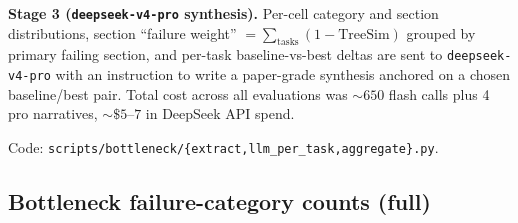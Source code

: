 \documentclass{article}
\begin{document}
\textbf{Stage 3 (\texttt{deepseek-v4-pro} synthesis).} Per-cell category and section distributions, section ``failure weight'' $= \sum_{\mathrm{tasks}}(1 - \mathrm{TreeSim})$ grouped by primary failing section, and per-task baseline-vs-best deltas are sent to \texttt{deepseek-v4-pro} with an instruction to write a paper-grade synthesis anchored on a chosen baseline/best pair. Total cost across all evaluations was ${\sim}650$ flash calls plus 4 pro narratives, ${\sim}\$5\text{--}7$ in DeepSeek API spend.

Code: \texttt{scripts/bottleneck/\{extract,llm\_per\_task,aggregate\}.py}.

\subsection{Bottleneck failure-category counts (full)}
\label{app:bottleneck-counts}

\begin{table}[h]
  \caption{Failure-category counts per cell. val panel uses $n=51$ tasks per cell ($3{\times}17$); held-out-eval panel uses $n=29$--$30$ ($3{\times}10$ minus a small number of LLM-judge parse-failures).}
  \label{tab:bottleneck}
  \centering
  \footnotesize
\end{table}

\end{document}
